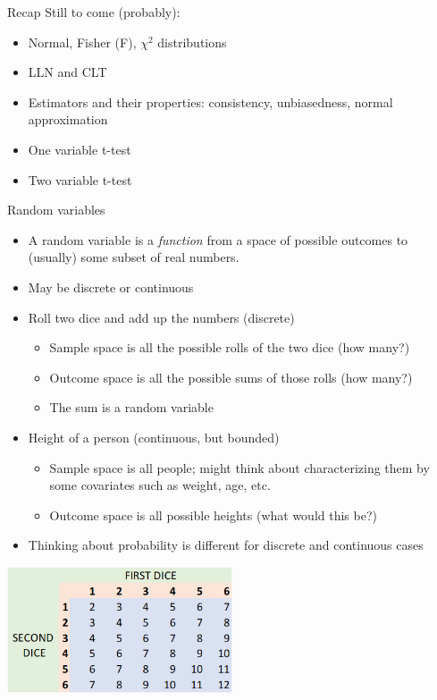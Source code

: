\documentclass[aspectratio=169]{beamer}
\begin{document}
\begin{frame}{Recap}
    Still to come (probably):
    \begin{itemize}
        \item Normal, Fisher (F), $\chi^2$ distributions      
        \item LLN and CLT
        \item Estimators and their properties: consistency, unbiasedness, normal approximation
        \item One variable t-test
        \item Two variable t-test
    \end{itemize}
\end{frame}

\begin{frame}{Random variables}
    \begin{itemize}
        \item A random variable is a \textit{function} from a space of possible outcomes to (usually) some subset of real numbers.
        \item May be discrete or continuous
        \item Roll two dice and add up the numbers (discrete)
            \begin{itemize}
                \item Sample space is all the possible rolls of the two dice (how many?)
                \item Outcome space is all the possible sums of those rolls (how many?)
                \item The sum is a random variable
            \end{itemize}
        \item Height of a person (continuous, but bounded)
            \begin{itemize}
                \item Sample space is all people; might think about characterizing them by some covariates such as weight, age, etc.
                \item Outcome space is all possible heights (what would this be?)
            \end{itemize}
        \item Thinking about probability is different for discrete and continuous cases
    \end{itemize}
\end{frame}

\begin{frame}
    \centering
    \includegraphics[width = 0.5\textwidth,keepaspectratio]{dice.png}
\end{frame}
\end{document}
